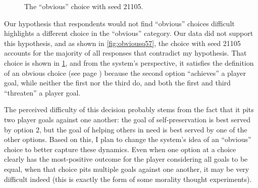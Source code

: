 \begin{figure}[!h]
\centering
{}
  \caption{The ``obvious'' choice with seed 21105.}
  \label{fig:ch21105}
\end{figure}


Our hypothesis that respondents would not find ``obvious'' choices difficult highlights a different choice in the ``obvious'' category.
%
Our data did not support this hypothesis, and as shown in \cref{fig:obviousq57}, the choice with seed 21105 accounts for the majority of all responses that contradict my hypothesis.
%
That choice is shown in \cref{fig:ch21105}, and from the system's perspective, it satisfies the definition of an obvious choice (see page \pageref{page:choicetypes}) because the second option ``achieves'' a player goal, while neither the first nor the third do, and both the first and third ``threaten'' a player goal.


The perceived difficulty of this decision probably stems from the fact that it pits two player goals against one another: the goal of self-preservation is best served by option 2, but the goal of helping others in need is best served by one of the other options.
%
Based on this, I plan to change the system's idea of an ``obvious'' choice to better capture these dynamics.
%
Even when one option at a choice clearly has the most-positive outcome for the player considering all goals to be equal, when that choice pits multiple goals against one another, it may be very difficult indeed (this is exactly the form of some morality thought experiments).


